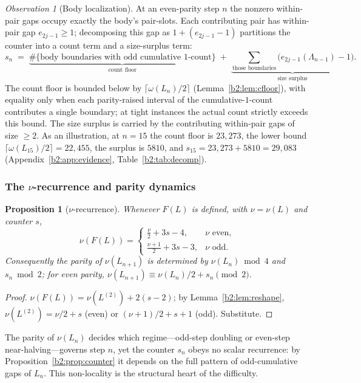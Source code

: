 \documentclass[a4paper]{article}
\theoremstyle{plain}
\newtheorem{proposition}{Proposition}[subsection]
\theoremstyle{definition}
\theoremstyle{remark}
\newtheorem{observation}{Observation}[subsection]
\begin{document}
\begin{observation}[Body localization]\label{b2:obs:decomp}
At an even-parity step $n$ the nonzero within-pair gaps occupy exactly the body's pair-slots. Each contributing pair has within-pair gap $e_{2j-1}\ge 1$; decomposing this gap as $1+(e_{2j-1}-1)$ partitions the counter into a count term and a size-surplus term:
\begin{equation}\label{b2:eq:decomp}
s_n \;=\; \underbrace{\#\{\text{body boundaries with odd cumulative $1$-count}\}}_{\text{count floor}}
\;+\;\underbrace{\sum_{\text{those boundaries}}\bigl(e_{2j-1}(\Lambda_{n-1})-1\bigr)}_{\text{size surplus}}.
\end{equation}
The count floor is bounded below by $\lceil\omega(L_n)/2\rceil$ (Lemma~\ref{b2:lem:cfloor}), with equality only when each parity-raised interval of the cumulative-$1$-count contributes a single boundary; at tight instances the actual count strictly exceeds this bound. The size surplus is carried by the contributing within-pair gaps of size $\ge 2$. As an illustration, at $n=15$ the count floor is $23{,}273$, the lower bound $\lceil\omega(L_{15})/2\rceil=22{,}455$, the surplus is $5810$, and $s_{15}=23{,}273+5810=29{,}083$ (Appendix~\ref{b2:app:evidence}, Table~\ref{b2:tab:decomp}).
\end{observation}

\subsubsection{The $\nu$-recurrence and parity dynamics}\label{b2:sec:nu}
\begin{proposition}[$\nu$-recurrence]\label{b2:prop:nu}
Whenever $F(L)$ is defined, with $\nu=\nu(L)$ and counter $s$,
\[ \nu(F(L))=\begin{cases}\tfrac{\nu}{2}+3s-4, & \nu\text{ even},\\ \tfrac{\nu+1}{2}+3s-3, & \nu\text{ odd}.\end{cases} \]
Consequently the parity of $\nu(L_{n+1})$ is determined by $\nu(L_n)\bmod 4$ and $s_n\bmod 2$; for even parity, $\nu(L_{n+1})\equiv\nu(L_n)/2+s_n\pmod 2$.
\end{proposition}
\begin{proof}
$\nu(F(L))=\nu(L^{(2)})+2(s-2)$; by Lemma~\ref{b2:lem:reshape}, $\nu(L^{(2)})=\nu/2+s$ (even) or $(\nu+1)/2+s+1$ (odd). Substitute.
\end{proof}

The parity of $\nu(L_n)$ decides which regime---odd-step doubling or even-step near-halving---governs step $n$, yet the counter $s_n$ obeys no scalar recurrence: by Proposition~\ref{b2:prop:counter} it depends on the full pattern of odd-cumulative gaps of $L_n$. This non-locality is the structural heart of the difficulty.
\end{document}
